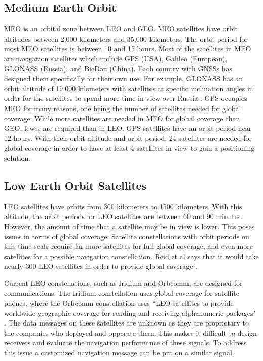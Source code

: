 \documentclass[12pt]{report}
\begin{document}
\subsection{Medium Earth Orbit}
MEO is an orbital zone between LEO and GEO. MEO satellites have orbit altitudes between 2,000 kilometers and 35,000 kilometers. The orbit period for most MEO satellites is between 10 and 15 hours. Most of the satellites in MEO are navigation satellites which include GPS (USA), Galileo (European), GLONASS (Russia), and BieDou (China). Each country with GNSSs has designed them specifically for their own use. For example, GLONASS has an orbit altitude of 19,000 kilometers with satellites at specific inclination angles in order for the satellites to spend more time in view over Russia \cite{GLONASSInterfaceControl1998a}. GPS occupies MEO for many reasons, one being the number of satellites needed for global coverage. While more satellites are needed in MEO for global coverage than GEO, fewer are required than in LEO. GPS satellites have an orbit period near 12 hours. With their orbit altitude and orbit period, 24 satellites are needed for global coverage in order to have at least 4 satellites in view to gain a positioning solution.  

\subsection{Low Earth Orbit Satellites}
LEO satellites have orbits from 300 kilometers to 1500 kilometers. With this altitude, the orbit periods for LEO satellites are between 60 and 90 minutes. However, the amount of time that a satellite may be in view is lower. This poses issues in terms of global coverage. Satellite constellations with orbit periods on this time scale require far more satellites for full global coverage, and even more satellites for a possible navigation constellation. Reid et al says that it would take nearly 300 LEO satellites in order to provide global coverage \cite{reidSatelliteNavigationAge2020}. 

Current LEO constellations, such as Iridium and Orbcomm, are designed for communications. The Iridium constellation uses global coverage for satellite phones, where the Orbcomm constellation uses ``LEO satellites to provide worldwide geographic coverage for sending and receiving alphanumeric packages" \cite{orabiOpportunisticNavigationDoppler2021}. The data messages on these satellites are unknown as they are proprietary to the companies who deployed and opperate them. This makes it difficult to design receivers and evaluate the navigation performance of these signals. To address this issue a customized navigation message can be put on a similar signal. 
\end{document}
